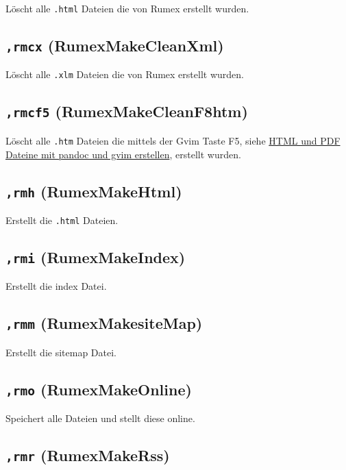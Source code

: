 Löscht alle \texttt{.html} Dateien die von Rumex erstellt wurden.

\subsection{\texttt{,rmcx}
(RumexMakeCleanXml)}\label{rmcx-rumexmakecleanxml}

Löscht alle \texttt{.xlm} Dateien die von Rumex erstellt wurden.

\subsection{\texttt{,rmcf5}
(RumexMakeCleanF8htm)}\label{rmcf5-rumexmakecleanf8htm}

Löscht alle \texttt{.htm} Dateien die mittels der Gvim Taste F5, siehe
\href{http://www.it-bayer.de/rumex/statik/index.htm}{HTML und PDF
Dateine mit pandoc und gvim erstellen}, erstellt wurden.

\subsection{\texttt{,rmh} (RumexMakeHtml)}\label{rmh-rumexmakehtml}

Erstellt die \texttt{.html} Dateien.

\subsection{\texttt{,rmi} (RumexMakeIndex)}\label{rmi-rumexmakeindex}

Erstellt die index Datei.

\subsection{\texttt{,rmm}
(RumexMakesiteMap)}\label{rmm-rumexmakesitemap}

Erstellt die sitemap Datei.

\subsection{\texttt{,rmo} (RumexMakeOnline)}\label{rmo-rumexmakeonline}

Speichert alle Dateien und stellt diese online.

\subsection{\texttt{,rmr} (RumexMakeRss)}\label{rmr-rumexmakerss}

